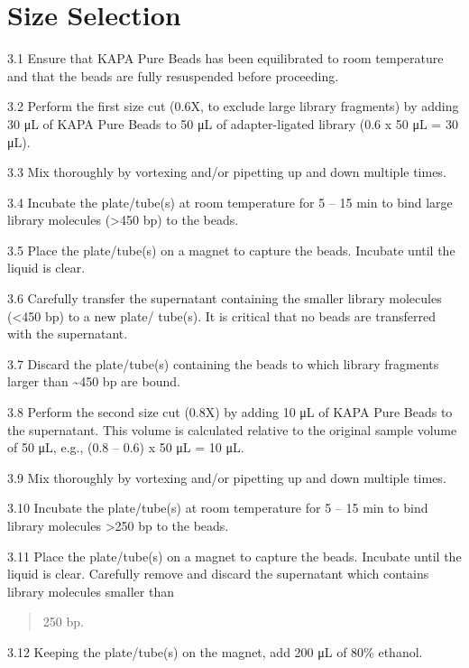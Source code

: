 \documentclass[
  letterpaper,
  DIV=11,
  numbers=noendperiod]{scrreprt}
\begin{document}
\hypertarget{size-selection}{%
\section*{\texorpdfstring{\textbf{Size
Selection}}{Size Selection}}\label{size-selection}}


3.1 Ensure that KAPA Pure Beads has been equilibrated to room
temperature and that the beads are fully resuspended before proceeding.

3.2 Perform the first size cut (0.6X, to exclude large library
fragments) by adding 30 μL of KAPA Pure Beads to 50 μL of
adapter-ligated library (0.6 x 50 μL = 30 μL).

3.3 Mix thoroughly by vortexing and/or pipetting up and down multiple
times.

3.4 Incubate the plate/tube(s) at room temperature for 5 -- 15 min to
bind large library molecules (\textgreater450 bp) to the beads.

3.5 Place the plate/tube(s) on a magnet to capture the beads. Incubate
until the liquid is clear.

3.6 Carefully transfer the supernatant containing the smaller library
molecules (\textless450 bp) to a new plate/ tube(s). It is critical that
no beads are transferred with the supernatant.

3.7 Discard the plate/tube(s) containing the beads to which library
fragments larger than \textasciitilde450 bp are bound.

3.8 Perform the second size cut (0.8X) by adding 10 μL of KAPA Pure
Beads to the supernatant. This volume is calculated relative to the
original sample volume of 50 μL, e.g., (0.8 -- 0.6) x 50 μL = 10 μL.

3.9 Mix thoroughly by vortexing and/or pipetting up and down multiple
times.

3.10 Incubate the plate/tube(s) at room temperature for 5 -- 15 min to
bind library molecules \textgreater250 bp to the beads.

3.11 Place the plate/tube(s) on a magnet to capture the beads. Incubate
until the liquid is clear. Carefully remove and discard the supernatant
which contains library molecules smaller than

\begin{quote}
250 bp.
\end{quote}

3.12 Keeping the plate/tube(s) on the magnet, add 200 μL of 80\%
ethanol.
\end{document}
